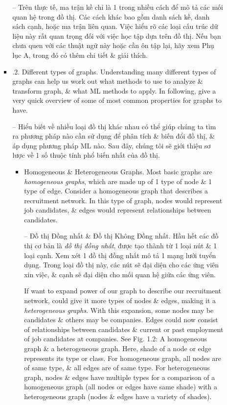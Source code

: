 \documentclass{article}
\begin{document}
\begin{itemize}
\begin{itemize}
\begin{itemize}
            -- Trên thực tế, ma trận kề chỉ là 1 trong nhiều cách để mô tả các mối quan hệ trong đồ thị. Các cách khác bao gồm danh sách kề, danh sách cạnh, hoặc ma trận liên quan. Việc hiểu rõ các loại cấu trúc dữ liệu này rất quan trọng đối với việc học tập dựa trên đồ thị. Nếu bạn chưa quen với các thuật ngữ này hoặc cần ôn tập lại, hãy xem Phụ lục A, trong đó có thêm chi tiết \& giải thích.
            \item {.2. Different types of graphs.} Understanding many different types of graphs can help us work out what methods to use to analyze \& transform graph, \& what ML methods to apply. In following, give a very quick overview of some of most common properties for graphs to have.

            -- Hiểu biết về nhiều loại đồ thị khác nhau có thể giúp chúng ta tìm ra phương pháp nào cần sử dụng để phân tích \& biến đổi đồ thị, \& áp dụng phương pháp ML nào. Sau đây, chúng tôi sẽ giới thiệu sơ lược về 1 số thuộc tính phổ biến nhất của đồ thị.
            \begin{itemize}
                \item {\sf Homogeneous \& Heterogeneous Graphs.} Most basic graphs are {\it homogeneous graphs}, which are made up of 1 type of node \& 1 type of edge. Consider a homogeneous graph that describes a recruitment network. In this type of graph, nodes would represent job candidates, \& edges would represent relationships between candidates.

                -- {\sf Đồ thị Đồng nhất \& Đồ thị Không Đồng nhất.} Hầu hết các đồ thị cơ bản là {\it đồ thị đồng nhất}, được tạo thành từ 1 loại nút \& 1 loại cạnh. Xem xét 1 đồ thị đồng nhất mô tả 1 mạng lưới tuyển dụng. Trong loại đồ thị này, các nút sẽ đại diện cho các ứng viên xin việc, \& cạnh sẽ đại diện cho mối quan hệ giữa các ứng viên.

                If want to expand power of our graph to describe our recruitment network, could give it more types of nodes \& edges, making it a {\it heterogeneous graphs}. With this expansion, some nodes may be candidates \& others may be companies. Edges could now consist of relationships between candidates \& current or past employment of job candidates at companies. See {\sf Fig. 1.2: A homogeneous graph \& a heterogeneous graph. Here, shade of a node or edge represents its type or class. For homogeneous graph, all nodes are of same type, \& all edges are of same type. For heterogeneous graph, nodes \& edges have multiple types} for a comparison of a homogeneous graph (all nodes or edges have same shade) with a heterogeneous graph (nodes \& edges have a variety of shades).


\end{itemize}
\end{itemize}
\end{itemize}
\end{itemize}
\end{document}
